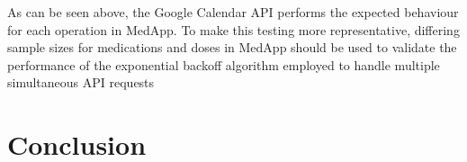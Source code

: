 \documentclass{l4proj}
\begin{document}
As can be seen above, the Google Calendar API performs the expected behaviour for each operation in MedApp. To make this testing more representative, differing sample sizes for medications and doses in MedApp should be used to validate the performance of the exponential backoff algorithm employed to handle multiple simultaneous API requests






\chapter{Conclusion}    



%
% 
\end{document}
